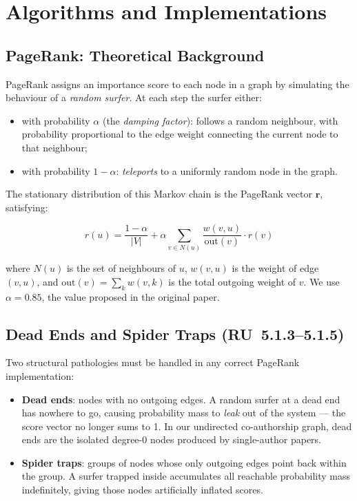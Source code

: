 \documentclass[12pt, a4paper]{article}
\begin{document}
\section{Algorithms and Implementations}
\label{sec:algorithms}

\subsection{PageRank: Theoretical Background}

PageRank \cite{brin1998} assigns an importance score to each node in a graph by simulating the behaviour of a \textit{random surfer}. At each step the surfer either:

\begin{itemize}
  \item with probability $\alpha$ (the \textit{damping factor}): follows a random neighbour, with probability proportional to the edge weight connecting the current node to that neighbour;
  \item with probability $1 - \alpha$: \textit{teleports} to a uniformly random node in the graph.
\end{itemize}

The stationary distribution of this Markov chain is the PageRank vector $\mathbf{r}$, satisfying:

\begin{equation}
  r(u) = \frac{1-\alpha}{|V|} + \alpha \sum_{v \in N(u)} \frac{w(v,u)}{\mathrm{out}(v)} \cdot r(v)
  \label{eq:pagerank}
\end{equation}

where $N(u)$ is the set of neighbours of $u$, $w(v,u)$ is the weight of edge $(v,u)$, and $\mathrm{out}(v) = \sum_{k} w(v,k)$ is the total outgoing weight of $v$. We use $\alpha = 0.85$, the value proposed in the original paper.

\subsection{Dead Ends and Spider Traps (RU~5.1.3--5.1.5)}

Two structural pathologies must be handled in any correct PageRank implementation:

\begin{itemize}
  \item \textbf{Dead ends}: nodes with no outgoing edges. A random surfer at a dead end has nowhere to go, causing probability mass to \textit{leak} out of the system — the score vector no longer sums to 1. In our undirected co-authorship graph, dead ends are the isolated degree-0 nodes produced by single-author papers.
  \item \textbf{Spider traps}: groups of nodes whose only outgoing edges point back within the group. A surfer trapped inside accumulates all reachable probability mass indefinitely, giving those nodes artificially inflated scores.
\end{itemize}
\end{document}
